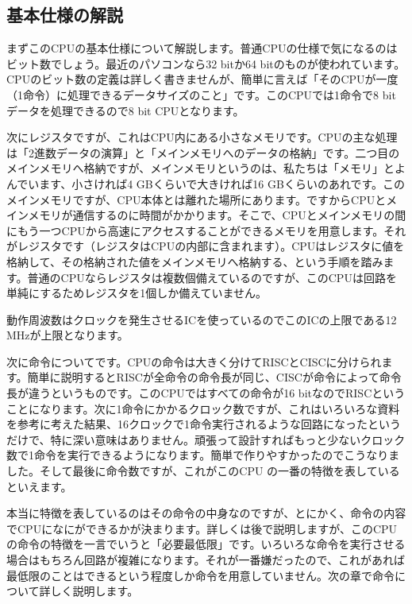 \documentclass[11pt,b5paper,papersize,dvipdfmx]{jsbook}
\begin{document}
\subsection{基本仕様の解説}
まずこのCPUの基本仕様について解説します。普通CPUの仕様で気になるのはビット数でしょう。最近のパソコンなら32 bitか64 bitのものが使われています。CPUのビット数の定義は詳しく書きませんが、簡単に言えば「そのCPUが一度（1命令）に処理できるデータサイズのこと」です。このCPUでは1命令で8 bitデータを処理できるので8 bit CPUとなります。\par
次にレジスタですが、これはCPU内にある小さなメモリです。CPUの主な処理は「2進数データの演算」と「メインメモリへのデータの格納」です。二つ目のメインメモリへ格納ですが、メインメモリというのは、私たちは「メモリ」とよんでいます、小さければ4 GBくらいで大きければ16 GBくらいのあれです。このメインメモリですが、CPU本体とは離れた場所にあります。ですからCPUとメインメモリが通信するのに時間がかかります。そこで、CPUとメインメモリの間にもう一つCPUから高速にアクセスすることができるメモリを用意します。それがレジスタです（レジスタはCPUの内部に含まれます）。CPUはレジスタに値を格納して、その格納された値をメインメモリへ格納する、という手順を踏みます。普通のCPUならレジスタは複数個備えているのですが、このCPUは回路を単純にするためレジスタを1個しか備えていません。\par
動作周波数はクロックを発生させるICを使っているのでこのICの上限である12 MHzが上限となります。\par
次に命令についてです。CPUの命令は大きく分けてRISCとCISCに分けられます。簡単に説明するとRISCが全命令の命令長が同じ、CISCが命令によって命令長が違うというものです。このCPUではすべての命令が16 bitなのでRISCということになります。次に1命令にかかるクロック数ですが、これはいろいろな資料を参考に考えた結果、16クロックで1命令実行されるような回路になったというだけで、特に深い意味はありません。頑張って設計すればもっと少ないクロック数で1命令を実行できるようになります。簡単で作りやすかったのでこうなりました。そして最後に命令数ですが、これがこのCPU の一番の特徴を表しているといえます。\par
本当に特徴を表しているのはその命令の中身なのですが、とにかく、命令の内容でCPUになにができるかが決まります。詳しくは後で説明しますが、このCPUの命令の特徴を一言でいうと「必要最低限」です。いろいろな命令を実行させる場合はもちろん回路が複雑になります。それが一番嫌だったので、これがあれば最低限のことはできるという程度しか命令を用意していません。次の章で命令について詳しく説明します。\par
\end{document}
